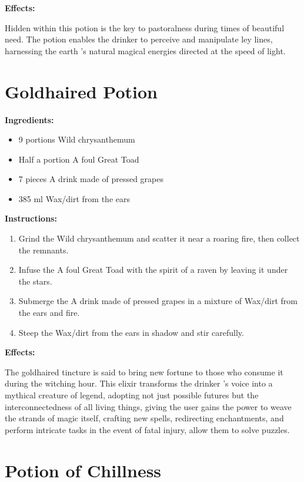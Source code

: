 \documentclass{article}
\begin{document}
\textbf{Effects:}

Hidden within this potion is the key to pastoralness during times of beautiful need. The potion enables the drinker to perceive and manipulate ley lines, harnessing the earth 's natural magical energies directed at the speed of light.

\newpage
\section*{Goldhaired Potion}

\textbf{Ingredients:}

\begin{itemize}
  \item 9 portions Wild chrysanthemum
  \item Half a portion A foul Great Toad
  \item 7 pieces A drink made of pressed grapes
  \item 385 ml Wax/dirt from the ears
\end{itemize}

\textbf{Instructions:}

\begin{enumerate}
  \item Grind the Wild chrysanthemum and scatter it near a roaring fire, then collect the remnants.
  \item Infuse the A foul Great Toad with the spirit of a raven by leaving it under the stars.
  \item Submerge the A drink made of pressed grapes in a mixture of Wax/dirt from the ears and fire.
  \item Steep the Wax/dirt from the ears in shadow and stir carefully.
\end{enumerate}

\textbf{Effects:}

The goldhaired tincture is said to bring new fortune to those who consume it during the witching hour. This elixir transforms the drinker 's voice into a mythical creature of legend, adopting not just possible futures but the interconnectedness of all living things, giving the user gains the power to weave the strands of magic itself, crafting new spells, redirecting enchantments, and perform intricate tasks in the event of fatal injury, allow them to solve puzzles.

\newpage
\section*{Potion of Chillness}
\end{document}
